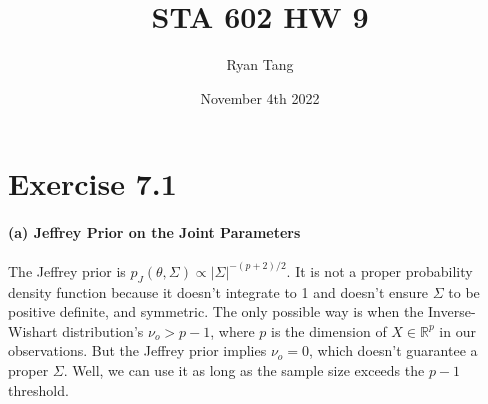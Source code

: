 \documentclass[11pt, letterpaper]{article}
\author{Ryan Tang}
\title{STA 602 HW 9}
\date{November 4th 2022}
\begin{document}
\maketitle

\section{Exercise 7.1}
\paragraph{(a) Jeffrey Prior on the Joint Parameters}
The Jeffrey prior is $p_J(\theta, \Sigma) \propto |\Sigma|^{-(p+2)/2}$. It is not a proper probability density function because it doesn't integrate to 1 and doesn't ensure $\Sigma$ to be positive definite, and symmetric. The only possible way is when the Inverse-Wishart distribution's $\nu_o > p - 1$, where $p$ is the dimension of $X \in \mathbb{R}^p$ in our observations. But the Jeffrey prior implies $\nu_o = 0$, which doesn't guarantee a proper $\Sigma$. Well, we can use it as long as the sample size exceeds the $p-1$ threshold.
\end{document}
